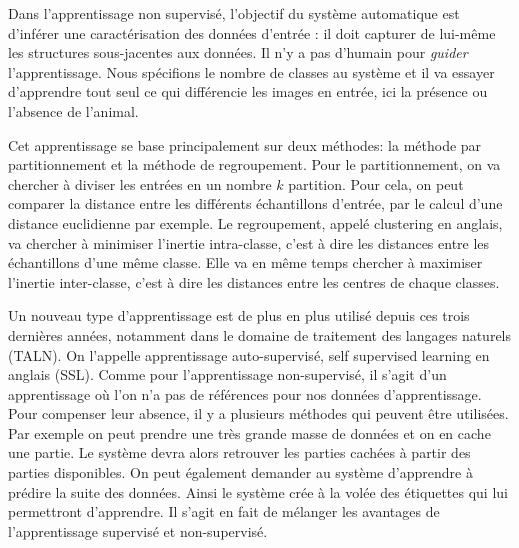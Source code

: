 
Dans l'apprentissage non supervisé, %
l'objectif du système automatique est d'inférer une caractérisation des données d'entrée : il doit capturer de lui-même les structures sous-jacentes aux données. Il n'y a pas d'humain pour \textit{guider} l'apprentissage. Nous spécifions le nombre de classes au système et il va essayer d'apprendre tout seul ce qui différencie les images en entrée, ici la présence ou l'absence de l'animal.

Cet apprentissage se base principalement sur deux méthodes: la méthode par partitionnement et la méthode de regroupement. Pour le partitionnement, on va chercher à diviser les entrées en un nombre $k$ partition. Pour cela, on peut comparer la distance entre les différents échantillons d'entrée, par le calcul d'une distance euclidienne par exemple. Le regroupement, appelé clustering en anglais, va chercher à minimiser l'inertie intra-classe, c'est à dire les distances entre les échantillons d'une même classe. Elle va en même temps chercher à maximiser l'inertie inter-classe, c'est à dire les distances entre les centres de chaque classes. %

Un nouveau type d'apprentissage est de plus en plus utilisé depuis ces trois dernières années, notamment dans le domaine de traitement des langages naturels (TALN). On l'appelle apprentissage auto-supervisé, self supervised learning en anglais (SSL). Comme pour l'apprentissage non-supervisé, il s'agit d'un apprentissage où l'on n'a pas de références pour nos données d'apprentissage. Pour compenser leur absence, il y a plusieurs méthodes qui peuvent être utilisées. Par exemple on peut prendre une très grande masse de données et on en cache une partie. Le système devra alors retrouver les parties cachées à partir des parties disponibles. On peut également demander au système d'apprendre à prédire la suite des données. Ainsi le système crée à la volée des étiquettes qui lui permettront d'apprendre. Il s'agit en fait de mélanger les avantages de l'apprentissage supervisé et non-supervisé.

